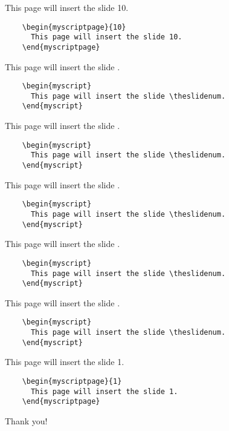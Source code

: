 \documentclass[10pt]{scrartcl}
\begin{document}
\begin{myscriptpage}{10}
  This page will insert the slide 10.
\begin{verbatim}
    \begin{myscriptpage}{10}
      This page will insert the slide 10.
    \end{myscriptpage}
\end{verbatim}
\end{myscriptpage}

\begin{myscript}
  This page will insert the slide \theslidenum.
\begin{verbatim}
    \begin{myscript}
      This page will insert the slide \theslidenum.
    \end{myscript}
\end{verbatim}
\end{myscript}

\begin{myscript}
  This page will insert the slide \theslidenum.
\begin{verbatim}
    \begin{myscript}
      This page will insert the slide \theslidenum.
    \end{myscript}
\end{verbatim}
\end{myscript}

\begin{myscript}
  This page will insert the slide \theslidenum.
\begin{verbatim}
    \begin{myscript}
      This page will insert the slide \theslidenum.
    \end{myscript}
\end{verbatim}
\end{myscript}

\begin{myscript}
  This page will insert the slide \theslidenum.
\begin{verbatim}
    \begin{myscript}
      This page will insert the slide \theslidenum.
    \end{myscript}
\end{verbatim}
\end{myscript}

\begin{myscript}
  This page will insert the slide \theslidenum.
\begin{verbatim}
    \begin{myscript}
      This page will insert the slide \theslidenum.
    \end{myscript}
\end{verbatim}
\end{myscript}

\begin{myscriptpage}{1}
  This page will insert the slide 1.
\begin{verbatim}
    \begin{myscriptpage}{1}
      This page will insert the slide 1.
    \end{myscriptpage}
\end{verbatim}
\end{myscriptpage}


\begin{myscript}
  Thank you!
\end{myscript}
\end{document}
